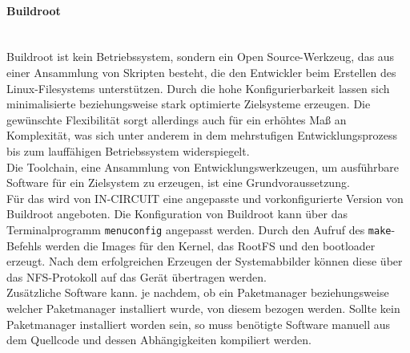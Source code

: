 \documentclass[../Bachelorarbeit.tex]{subfiles}
\begin{document}
\paragraph{Buildroot}\mbox{}\\ 
Buildroot ist kein Betriebssystem, sondern ein Open Source-Werkzeug, das aus einer 
Ansammlung von Skripten besteht, die den Entwickler beim Erstellen des Linux-Filesystems unterstützen. Durch die hohe Konfigurierbarkeit lassen sich minimalisierte 
beziehungsweise stark optimierte Zielsysteme erzeugen. Die gewünschte Flexibilität sorgt 
allerdings auch für ein erhöhtes Maß an Komplexität, was sich unter anderem in dem 
mehrstufigen Entwicklungsprozess bis zum lauffähigen Betriebssystem widerspiegelt.\\
Die Toolchain, eine Ansammlung von Entwicklungswerkzeugen, um ausführbare Software 
für ein Zielsystem zu erzeugen, ist eine Grundvoraussetzung. \\
Für das  wird von IN-CIRCUIT eine angepasste und vorkonfigurierte Version von 
Buildroot angeboten. Die Konfiguration von Buildroot kann über das Terminalprogramm 
\texttt{menuconfig} angepasst werden. Durch den Aufruf des \texttt{make}-Befehls werden die Images 
für den Kernel, das \ac{RootFS} und den bootloader erzeugt.
Nach dem erfolgreichen Erzeugen der Systemabbilder können diese über das \ac{NFS}-Protokoll auf das Gerät übertragen werden. \\
Zusätzliche Software kann. je nachdem, ob ein Paketmanager beziehungsweise welcher 
Paketmanager installiert wurde, von diesem bezogen werden. Sollte kein Paketmanager 
installiert worden sein, so muss benötigte Software manuell aus dem Quellcode und 
dessen Abhängigkeiten kompiliert werden.
\end{document}
